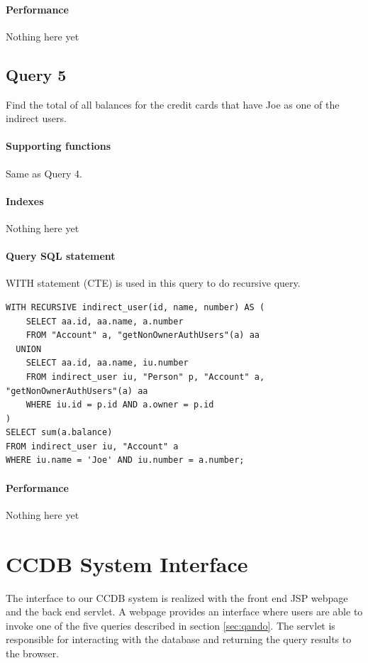 \documentclass[11pt]{article}
\begin{document}
\paragraph{Performance} Nothing here yet

\subsection{Query 5}
Find the total of all balances for the credit cards that have Joe as one of the indirect users.

\paragraph{Supporting functions} Same as Query 4.

\paragraph{Indexes} Nothing here yet

\paragraph{Query SQL statement} WITH statement (CTE) is used in this query to do recursive query.
\begin{verbatim}
WITH RECURSIVE indirect_user(id, name, number) AS (
    SELECT aa.id, aa.name, a.number
    FROM "Account" a, "getNonOwnerAuthUsers"(a) aa
  UNION
    SELECT aa.id, aa.name, iu.number
    FROM indirect_user iu, "Person" p, "Account" a, "getNonOwnerAuthUsers"(a) aa
    WHERE iu.id = p.id AND a.owner = p.id
)
SELECT sum(a.balance)
FROM indirect_user iu, "Account" a
WHERE iu.name = 'Joe' AND iu.number = a.number;
\end{verbatim}

\paragraph{Performance} Nothing here yet

\section{CCDB System Interface}
The interface to our CCDB system is realized with the front end JSP webpage and the back end servlet. A webpage provides an interface where users are able to invoke one of the five queries described in section \ref{sec:qando}. The servlet is responsible for interacting with the database and returning the query results to the browser.
\end{document}
